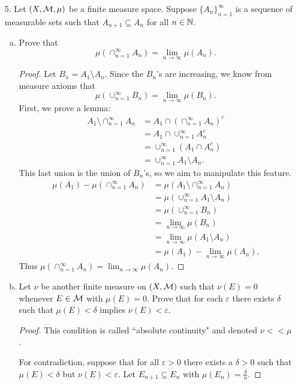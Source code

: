 \begin{itemize}
\item[5.] Let $(X,\mathcal{M},\mu)$ be a finite measure space. Suppose $\{A_n\}_{n=1}^{\infty}$ is a sequence of measurable sets such that $A_{n+1} \subseteq A_{n}$ for all $n \in \mathbb{N}$.
\begin{enumerate}[(a)]
\item Prove that 
$$\mu(\cap_{n=1}^{\infty} A_n) = \lim_{n \rightarrow \infty} \mu(A_n).$$
\begin{proof}
Let $B_n = A_1 \setminus A_n$. Since the $B_n$'s are increasing, we know from measure axioms that
$$\mu\left(\cup_{n=1}^{\infty} B_n\right) = \lim_{n \rightarrow \infty} \mu(B_n).$$
First, we prove a lemma: 
\begin{align*}
    A_1 \setminus \cap_{n=1}^{\infty} A_n &= A_1 \cap \left(\cap_{n=1}^{\infty} A_n\right)^c \\
    &= A_1 \cap \cup_{n=1}^{\infty} A_n^c \\ 
    &= \cup_{n=1}^{\infty} (A_1 \cap A_n^c) \\
    &= \cup_{n=1}^{\infty} A_1 \setminus A_n.
\end{align*}
This last union is the union of $B_n$'s, so we aim to manipulate this feature. 
\begin{align*}
    \mu(A_1) - \mu(\cap_{n=1}^{\infty} A_n) &= \mu(A_1 \setminus \cap_{n=1}^{\infty} A_n) \\  
    &= \mu(\cup_{n=1}^{\infty} A_1 \setminus A_n) \\ 
    &= \mu(\cup_{n=1}^{\infty} B_n) \\ 
    &= \lim_{n \rightarrow \infty} \mu(B_n) \\
    &= \lim_{n \rightarrow \infty} \mu(A_1 \setminus A_n) \\
    &= \mu(A_1) - \lim_{n \rightarrow \infty} \mu(A_n).
\end{align*}
Thus $\mu(\cap_{n=1}^{\infty} A_n) = \lim_{n \rightarrow \infty} \mu(A_n)$.
\end{proof}

\item Let $\nu$ be another finite measure on $(X,\mathcal{M})$ such that $\nu(E)=0$ whenever $E \in \mathcal{M}$ with $\mu(E)=0$. Prove that for each $\varepsilon$ there exists $\delta$ such that $\mu(E) < \delta$ implies $\nu(E) < \varepsilon$.
\begin{proof}
This condition is called ``absolute continuity" and denoted $\nu << \mu$.

\medskip 

For contradiction, suppose that for all $\varepsilon > 0$ there exists a $\delta > 0$ such that $\mu(E)<\delta$ but $\nu(E)<\varepsilon$. Let $E_{n+1} \subseteq E_{n}$ with $\mu(E_n) = \frac{\delta}{n}$.


\end{proof}
\end{enumerate}
\end{itemize}
